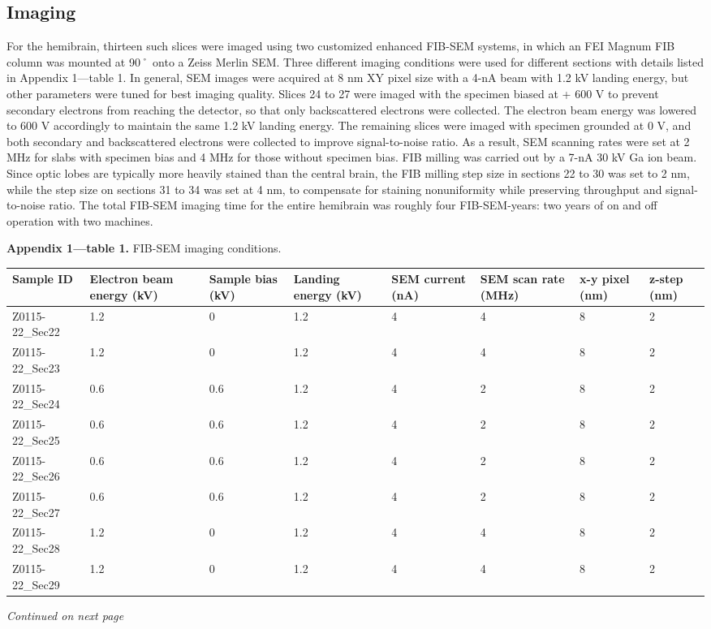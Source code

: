 \documentclass{article}
\begin{document}
\subsection*{Imaging}

For the hemibrain, thirteen such slices were imaged using two customized enhanced FIB-SEM systems, in which an FEI Magnum FIB column was mounted at 90˚ onto a Zeiss Merlin SEM. Three different imaging conditions were used for different sections with details listed in Appendix 1—table 1. In general, SEM images were acquired at 8 nm XY pixel size with a 4-nA beam with 1.2 kV landing energy, but other parameters were tuned for best imaging quality. Slices 24 to 27 were imaged with the specimen biased at + 600 V to prevent secondary electrons from reaching the detector, so that only backscattered electrons were collected. The electron beam energy was lowered to 600 V accordingly to maintain the same 1.2 kV landing energy. The remaining slices were imaged with specimen grounded at 0 V, and both secondary and backscattered electrons were collected to improve signal-to-noise ratio. As a result, SEM scanning rates were set at 2 MHz for slabs with specimen bias and 4 MHz for those without specimen bias. FIB milling was carried out by a 7-nA 30 kV Ga ion beam. Since optic lobes are typically more heavily stained than the central brain, the FIB milling step size in sections 22 to 30 was set to 2 nm, while the step size on sections 31 to 34 was set at 4 nm, to compensate for staining nonuniformity while preserving throughput and signal-to-noise ratio. The total FIB-SEM imaging time for the entire hemibrain was roughly four FIB-SEM-years: two years of on and off operation with two machines.

\noindent\textbf{Appendix 1—table 1.} FIB-SEM imaging conditions.
\begin{center}\footnotesize
\begin{longtable}{p{1.3cm}p{1.3cm}p{1.1cm}p{1.2cm}p{1.2cm}p{1.3cm}p{1cm}p{0.9cm}}
\textbf{Sample ID} & \textbf{Electron beam energy (kV)} & \textbf{Sample bias (kV)} & \textbf{Landing energy (kV)} & \textbf{SEM current (nA)} & \textbf{SEM scan rate (MHz)} & \textbf{x-y pixel (nm)} & \textbf{z-step (nm)} \\
\hline
Z0115-22\_Sec22 & 1.2 & 0 & 1.2 & 4 & 4 & 8 & 2 \\
Z0115-22\_Sec23 & 1.2 & 0 & 1.2 & 4 & 4 & 8 & 2 \\
Z0115-22\_Sec24 & 0.6 & 0.6 & 1.2 & 4 & 2 & 8 & 2 \\
Z0115-22\_Sec25 & 0.6 & 0.6 & 1.2 & 4 & 2 & 8 & 2 \\
Z0115-22\_Sec26 & 0.6 & 0.6 & 1.2 & 4 & 2 & 8 & 2 \\
Z0115-22\_Sec27 & 0.6 & 0.6 & 1.2 & 4 & 2 & 8 & 2 \\
Z0115-22\_Sec28 & 1.2 & 0 & 1.2 & 4 & 4 & 8 & 2 \\
Z0115-22\_Sec29 & 1.2 & 0 & 1.2 & 4 & 4 & 8 & 2 \\
\end{longtable}
\end{center}
\noindent\emph{Continued on next page}
\end{document}
